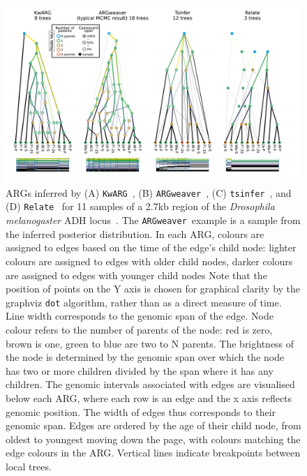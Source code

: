 \documentclass{article}
\newcommand{\tsinfer}[0]{\texttt{tsinfer}}
\newcommand{\kwarg}[0]{\texttt{KwARG}}
\newcommand{\argweaver}[0]{\texttt{ARGweaver}}
\newcommand{\relate}[0]{\texttt{Relate}}
\begin{document}
\begin{figure} \begin{center}
\includegraphics[width=\textwidth]{illustrations/inference.pdf} \end{center}
\caption{\label{fig-inferred-args} ARGs inferred by
(A) \kwarg~\citep{ignatieva2021kwarg},
(B) \argweaver~\citep{rasmussen2014genome,hubisz2020inference},
(C) \tsinfer~\citep{kelleher2019inferring},
and (D) \relate~\citep{speidel2019method}
for 11 samples of a 2.7kb region of the \textit{Drosophila melanogaster} ADH
locus~\citep{kreitman1983nucleotide}. The \argweaver\ example
is a sample from the inferred posterior distribution. In each ARG,
colours are assigned to edges based on the time of the edge's child node:
lighter colours are assigned to edges with older child
nodes, darker colours are assigned to edges with younger child nodes
Note that the position of points on the
Y axis is chosen for graphical clarity by the graphviz \texttt{dot}
algorithm, rather than as a direct measure of time.
Line width corresponds to the genomic span of the edge. Node colour
refers to the number of parents of the node: red is zero, brown is one,
green to blue are two to N parents. The brightness
of the node is determined by the genomic span over which
the node has two or more children divided by the span where it has any
children. The genomic intervals associated with edges are visualised below
each ARG, where each row is an edge
and the x axis reflects genomic position. The width of edges
thus corresponds to their genomic span. Edges
are ordered by the age of their child node, from oldest to youngest
moving down the page, with colours matching the edge colours in the ARG.
Vertical lines indicate breakpoints between local trees.
}
\end{figure}
\end{document}
